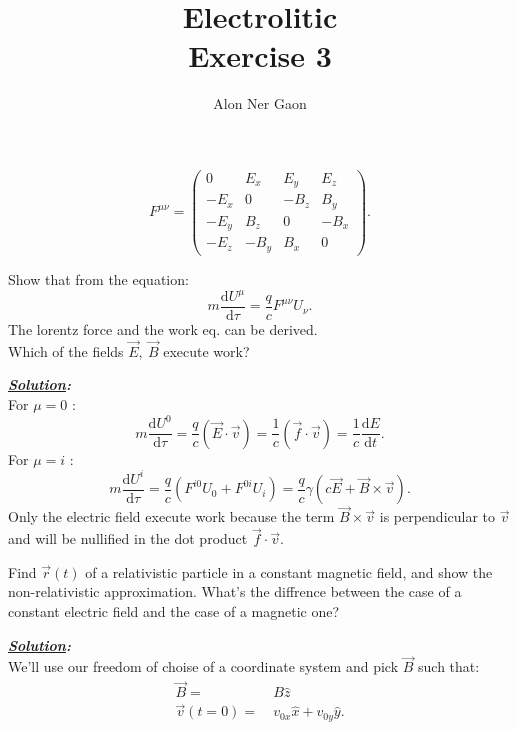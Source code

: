 \documentclass[notitlepage]{report}
\title{\Huge{Electrolitic}\\Exercise 3}
\author{Alon Ner Gaon}
\begin{document}
\maketitle
\[
	F^{\mu\nu}=
	\begin{pmatrix}
	 0 & E_x & E_y & E_z\\
	 -E_x & 0 & -B_z & B_y\\
	 -E_y & B_z & 0 & -B_x\\
	 -E_z & -B_y & B_x & 0
	\end{pmatrix}
.\] 
\begin{question}[title = Question 1.1]{}{}
Show that from the equation:\\
\[
	m\frac{\text{d}U^{\mu}}{\text{d}\tau}=\frac{q}{c}F^{\mu\nu}U_\nu
.\] 
The lorentz force and the work eq. can be derived.\\
Which of the fields $\vec{E},\ \vec{B}$ execute work?
\end{question}
\textbf{\emph{\underline{Solution}:}}\\
For $\mu=0$ :\\
\[
	m \frac{\text{d}U^{0}}{\text{d}\tau} = \frac{q}{c}\left(\vec{E}\cdot \vec{v}\right)=\frac{1}{c}\left(\vec{f}\cdot \vec{v}\right)=\frac{1}{c}\frac{\text{d}E}{\text{d}t}  
.\] 
For $\mu=i$ :\\
\[
	m \frac{\text{d}U^{i}}{\text{d}\tau}  =\frac{q}{c}\left(F^{i0}U_0+F^{0i}U_i\right)  = \frac{q}{c}\gamma\left(c \vec{E}+\vec{B}\times \vec{v}\right)  
.\] 
Only the electric field execute work because the term $\vec{B}\times \vec{v}$ is perpendicular to $\vec{v}$ and will be nullified in the dot product $\vec{f} \cdot \vec{v}$.
\begin{question}[title = Question 1.2]{}{}
Find $\vec{r}\left(t\right) $ of a relativistic particle in a constant magnetic field, and show the non-relativistic approximation. What's the diffrence between the case of a constant electric field and the case of a magnetic one?
\end{question}
\textbf{\emph{\underline{Solution}:}}\\
We'll use our freedom of choise of a coordinate system and pick $\vec{B}$ such that:
\begin{align*}
	\vec{B} =&\ B\hat{z}\\
	\vec{v}\left(t=0\right) =&\ v_{0x}\hat{x}+v_{0y}\hat{y} 
.\end{align*}
\end{document}
